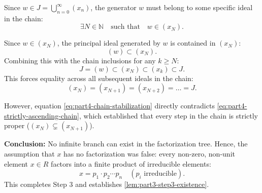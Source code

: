 \begin{proofWrapper}
\begin{content}
Since $w \in J = \bigcup_{n=0}^\infty (x_n)$, the generator $w$ must belong to some specific ideal in the chain:
\begin{equation}\label{eq:part4-w-in-specific-xn}
\exists N \in \mathbb{N} \quad \text{such that} \quad w \in (x_N).
\end{equation}

Since $w \in (x_N)$, the principal ideal generated by $w$ is contained in $(x_N)$:
\[
(w) \subset (x_N).
\]
Combining this with the chain inclusions for any $k \ge N$:
\begin{equation}\label{eq:part4-collapse-chain}
J = (w) \subset (x_N) \subset (x_k) \subset J.
\end{equation}
This forces equality across all subsequent ideals in the chain:
\begin{equation}\label{eq:part4-chain-stabilization}
(x_N) = (x_{N+1}) = (x_{N+2}) = \dots = J.
\end{equation}

However, equation \eqref{eq:part4-chain-stabilization} directly contradicts \eqref{eq:part4-strictly-ascending-chain}, which established that every step in the chain is strictly proper ($(x_N) \subsetneq (x_{N+1})$).

\textbf{Conclusion:} No infinite branch can exist in the factorization tree. Hence, the assumption that $x$ has no factorization was false: every non-zero, non-unit element $x \in R$ factors into a finite product of irreducible elements:
\[
x = p_1 \cdot p_2 \cdots p_n \quad (p_i \text{ irreducible}).
\]
This completes Step 3 and establishes \cref{lem:part3-step3-existence}.
\end{content}
\end{proofWrapper}

